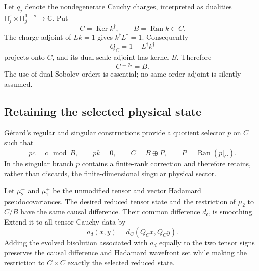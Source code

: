 \documentclass[11pt]{article}
\theoremstyle{definition}
\theoremstyle{remark}
\newcommand{\Ker}{\operatorname{Ker}}
\newcommand{\Ran}{\operatorname{Ran}}
\begin{document}
Let $q_j$ denote the nondegenerate Cauchy charges, interpreted as dualities
$\mathsf H_j^s\times\mathsf H_j^{1-s}\to\mathbb C$.  Put
\begin{equation}
 C=\Ker k^\dagger,
 \qquad B=\Ran k\subset C.
\end{equation}
The charge adjoint of $Lk=1$ gives $k^\dagger L^\dagger=1$.  Consequently
\begin{equation}
 Q_C=1-L^\dagger k^\dagger
\end{equation}
projects onto $C$, and its dual-scale adjoint has kernel $B$.  Therefore
\begin{equation}
 C^{\perp q_2}=B.
 \label{eq:coisotropic}
\end{equation}
The use of dual Sobolev orders is essential; no same-order adjoint is silently assumed.

\subsection{Retaining the selected physical state}

G\'erard's regular and singular constructions provide a quotient selector $p$ on $C$
such that
\begin{equation}
 pc=c\mod B,
 \qquad pk=0,
 \qquad C=B\oplus P,
 \qquad P=\Ran(p|_C).
 \label{eq:pselector}
\end{equation}
In the singular branch $p$ contains a finite-rank correction and therefore retains,
rather than discards, the finite-dimensional singular physical sector.

Let $\mu_2^\pm$ and $\mu_1^\pm$ be the unmodified tensor and vector Hadamard
pseudocovariances.  The desired reduced tensor state and the restriction of $\mu_2$
to $C/B$ have the same causal difference.  Their common difference $d_C$ is smoothing.
Extend it to all tensor Cauchy data by
\begin{equation}
 a_d(x,y)=d_C(Q_Cx,Q_Cy).
 \label{eq:dextension}
\end{equation}
Adding the evolved bisolution associated with $a_d$ equally to the two tensor signs
preserves the causal difference and Hadamard wavefront set while making the restriction
to $C\times C$ exactly the selected reduced state.
\end{document}
